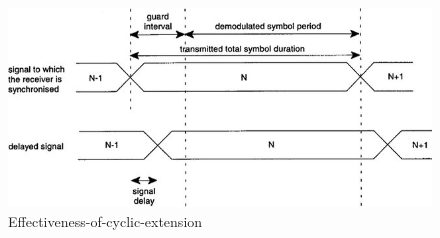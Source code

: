 \begin{figure}[ht]
    \centering
    \includegraphics[width=\textwidth]{Figures/Effectiveness-of-cyclic-extension}
    \caption{Effectiveness-of-cyclic-extension}
    \label{Effectiveness-of-cyclic-extension}
\end{figure}




\newpage
